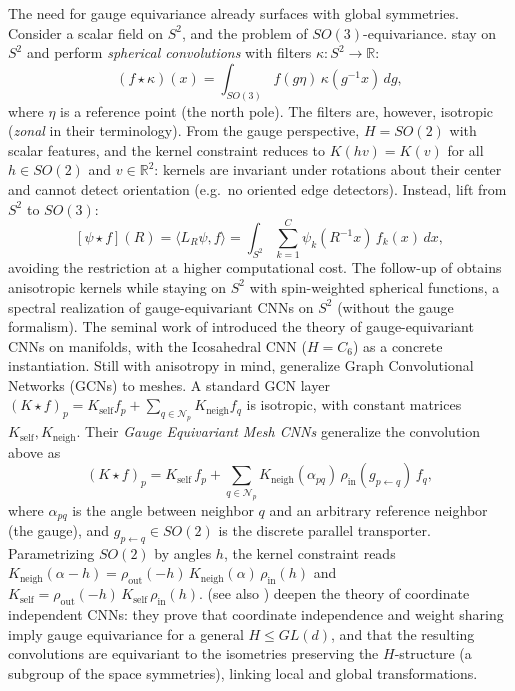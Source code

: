 \documentclass[mathematics,review,submit,moreauthors]{Definitions/mdpi}
\begin{document}
The need for gauge equivariance already surfaces with global symmetries.
Consider a scalar field on $S^2$, and the problem of $SO(3)$-equivariance.
\citet{esteves2018} stay on $S^2$ and perform \emph{spherical convolutions} with filters $\kappa:S^2\to\mathbb{R}$:
\[
    (f\star \kappa)(x)=\int_{SO(3)} f(g\eta)\,\kappa(g^{-1}x)\,dg,
\]
where $\eta$ is a reference point (the north pole).
The filters are, however, isotropic (\emph{zonal} in their terminology).
From the gauge perspective, $H=SO(2)$ with scalar features, and the kernel constraint reduces to $K(hv)=K(v)$ for all $h\in SO(2)$ and $v\in\mathbb{R}^2$: kernels are invariant under rotations about their center and cannot detect orientation (e.g.\ no oriented edge detectors).
Instead, \citet{cohen2018} lift from $S^2$ to $SO(3)$:
\[
    [\psi \star f](R) = \langle L_R \psi, f \rangle = \int_{S^2} \sum_{k=1}^{C} \psi_k(R^{-1}x)\, f_k(x)\, dx,
\]
avoiding the restriction at a higher computational cost.
The follow-up of \citet{esteves2020anips} obtains anisotropic kernels while staying on $S^2$ with spin-weighted spherical functions, a spectral realization of gauge-equivariant CNNs on $S^2$ (without the gauge formalism).
The seminal work of \citet{cohen2019p3icml} introduced the theory of gauge-equivariant CNNs on manifolds, with the Icosahedral CNN ($H=C_6$) as a concrete instantiation.
Still with anisotropy in mind, \citet{haan2020} generalize Graph Convolutional Networks (GCNs) to meshes.
A standard GCN layer $(K\star f)_p=K_{\mathrm{self}}f_p+\sum_{q\in\mathcal{N}_p}K_{\mathrm{neigh}}f_q$ is isotropic, with constant matrices $K_{\mathrm{self}},K_{\mathrm{neigh}}$.
Their \emph{Gauge Equivariant Mesh CNNs} generalize the convolution above as
\[
    (K \star f)_p = K_{\mathrm{self}}\, f_p + \sum_{q \in \mathcal{N}_p} K_{\mathrm{neigh}}(\alpha_{pq})\, \rho_{\mathrm{in}}(g_{p\leftarrow q})\, f_q,
\]
where $\alpha_{pq}$ is the angle between neighbor $q$ and an arbitrary reference neighbor (the gauge), and $g_{p\leftarrow q}\in SO(2)$ is the discrete parallel transporter.
Parametrizing $SO(2)$ by angles $h$, the kernel constraint reads $K_{\mathrm{neigh}}(\alpha-h)=\rho_{\mathrm{out}}(-h)\,K_{\mathrm{neigh}}(\alpha)\,\rho_{\mathrm{in}}(h)$ and $K_{\mathrm{self}}=\rho_{\mathrm{out}}(-h)\,K_{\mathrm{self}}\,\rho_{\mathrm{in}}(h)$.
\citet{weiler2021} (see also \citep{weiler2026}) deepen the theory of coordinate independent CNNs: they prove that coordinate independence and weight sharing imply gauge equivariance for a general $H\leq GL(d)$, and that the resulting convolutions are equivariant to the isometries preserving the $H$-structure (a subgroup of the space symmetries), linking local and global transformations.
\end{document}

